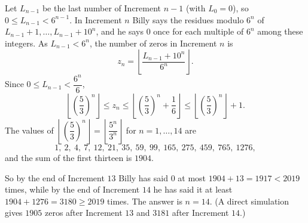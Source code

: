 Let $L_{n-1}$ be the last number of Increment $n-1$ (with $L_0=0$), so $0\le L_{n-1}<6^{n-1}$. In Increment $n$ Billy says the residues modulo $6^n$ of $L_{n-1}+1,\dots,L_{n-1}+10^n$, and he says $0$ once for each multiple of $6^n$ among these integers. As $L_{n-1}<6^n$, the number of zeros in Increment $n$ is
\[
z_n=\left\lfloor\dfrac{L_{n-1}+10^n}{6^n}\right\rfloor .
\]
Since $0\le L_{n-1}<\dfrac{6^n}{6}$,
\[
\left\lfloor\left(\dfrac{5}{3}\right)^n\right\rfloor\le z_n\le\left\lfloor\left(\dfrac{5}{3}\right)^n+\dfrac{1}{6}\right\rfloor\le\left\lfloor\left(\dfrac{5}{3}\right)^n\right\rfloor+1 .
\]
The values of $\left\lfloor\left(\dfrac{5}{3}\right)^n\right\rfloor=\left\lfloor\dfrac{5^n}{3^n}\right\rfloor$ for $n=1,\dots,14$ are
\[
1,\ 2,\ 4,\ 7,\ 12,\ 21,\ 35,\ 59,\ 99,\ 165,\ 275,\ 459,\ 765,\ 1276,
\]
and the sum of the first thirteen is $1904$.

So by the end of Increment $13$ Billy has said $0$ at most $1904+13=1917<2019$ times, while by the end of Increment $14$ he has said it at least $1904+1276=3180\ge2019$ times. The answer is $n=\boxed{14}$. (A direct simulation gives $1905$ zeros after Increment $13$ and $3181$ after Increment $14$.)
